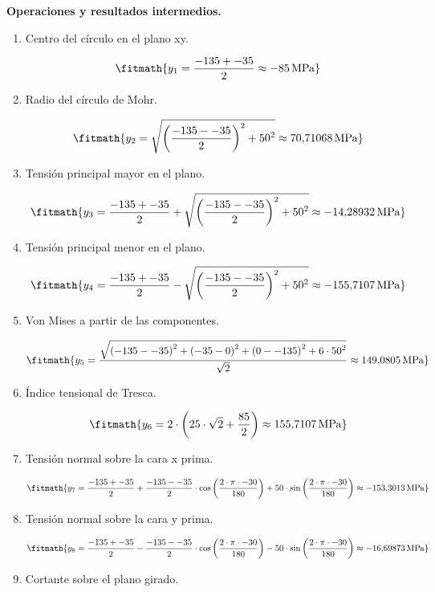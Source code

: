 \noindent\textbf{Operaciones y resultados intermedios.}

\begin{enumerate}

\item Centro del círculo en el plano xy.

\[\fitmath{y_{1}=\frac{-135+-35}{2}\approx -85\,\mathrm{MPa}}\]

\item Radio del círculo de Mohr.

\[\fitmath{y_{2}=\sqrt{{\left(\frac{-135--35}{2}\right)}^{2}+{50}^{2}}\approx 70{,}71068\,\mathrm{MPa}}\]

\item Tensión principal mayor en el plano.

\[\fitmath{y_{3}=\frac{-135+-35}{2}+\sqrt{{\left(\frac{-135--35}{2}\right)}^{2}+{50}^{2}}\approx -14{,}28932\,\mathrm{MPa}}\]

\item Tensión principal menor en el plano.

\[\fitmath{y_{4}=\frac{-135+-35}{2}-\sqrt{{\left(\frac{-135--35}{2}\right)}^{2}+{50}^{2}}\approx -155{,}7107\,\mathrm{MPa}}\]

\item Von Mises a partir de las componentes.

\[\fitmath{y_{5}=\frac{\sqrt{{\left(-135--35\right)}^{2}+{\left(-35-0\right)}^{2}+{\left(0--135\right)}^{2}+6\cdot {50}^{2}}}{\sqrt{2}}\approx 149{,}0805\,\mathrm{MPa}}\]

\item Índice tensional de Tresca.

\[\fitmath{y_{6}=2\cdot \left(25\cdot \sqrt{2}+\frac{85}{2}\right)\approx 155{,}7107\,\mathrm{MPa}}\]

\item Tensión normal sobre la cara x prima.

\[\fitmath{y_{7}=\frac{-135+-35}{2}+\frac{-135--35}{2}\cdot \cos\left(\frac{2\cdot \pi\cdot -30}{180}\right)+50\cdot \sin\left(\frac{2\cdot \pi\cdot -30}{180}\right)\approx -153{,}3013\,\mathrm{MPa}}\]

\item Tensión normal sobre la cara y prima.

\[\fitmath{y_{8}=\frac{-135+-35}{2}-\frac{-135--35}{2}\cdot \cos\left(\frac{2\cdot \pi\cdot -30}{180}\right)-50\cdot \sin\left(\frac{2\cdot \pi\cdot -30}{180}\right)\approx -16{,}69873\,\mathrm{MPa}}\]

\item Cortante sobre el plano girado.


\end{enumerate}

